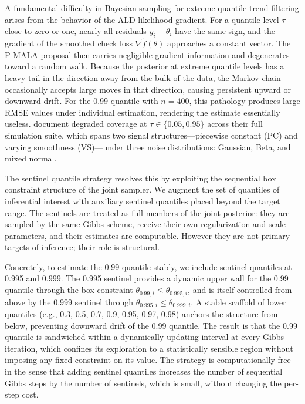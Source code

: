 A fundamental difficulty in Bayesian sampling for extreme quantile trend filtering arises from the behavior of the ALD likelihood gradient. For a quantile level $\tau$ close to zero or one, nearly all residuals $y_i - \theta_i$ have the same sign, and the gradient of the smoothed check loss $\nabla \tilde{f}(\theta)$ approaches a constant vector. The P-MALA proposal then carries negligible gradient information and degenerates toward a random walk. Because the posterior at extreme quantile levels has a heavy tail in the direction away from the bulk of the data, the Markov chain occasionally accepts large moves in that direction, causing persistent upward or downward drift. For the 0.99 quantile with $n = 400$, this pathology produces large RMSE values under individual estimation, rendering the estimate essentially useless. \citet{onizuka2024fast} document degraded coverage at $\tau \in \{0.05, 0.95\}$ across their full simulation suite, which spans two signal structures---piecewise constant (PC) and varying smoothness (VS)---under three noise distributions: Gaussian, Beta, and mixed normal.

The sentinel quantile strategy resolves this by exploiting the sequential box constraint structure of the joint sampler. We augment the set of quantiles of inferential interest with auxiliary sentinel quantiles placed beyond the target range. The sentinels are treated as full members of the joint posterior: they are sampled by the same Gibbs scheme, receive their own regularization and scale parameters, and their estimates are computable. However they are not primary targets of inference; their role is structural.

Concretely, to estimate the 0.99 quantile stably, we include sentinel quantiles at 0.995 and 0.999. The 0.995 sentinel provides a dynamic upper wall for the 0.99 quantile through the box constraint $\theta_{0.99, i} \leq \theta_{0.995, i}$, and is itself controlled from above by the 0.999 sentinel through $\theta_{0.995, i} \leq \theta_{0.999, i}$. A stable scaffold of lower quantiles (e.g., 0.3, 0.5, 0.7, 0.9, 0.95, 0.97, 0.98) anchors the structure from below, preventing downward drift of the 0.99 quantile. The result is that the 0.99 quantile is sandwiched within a dynamically updating interval at every Gibbs iteration, which confines its exploration to a statistically sensible region without imposing any fixed constraint on its value. The strategy is computationally free in the sense that adding sentinel quantiles increases the number of sequential Gibbs steps by the number of sentinels, which is small, without changing the per-step cost.

